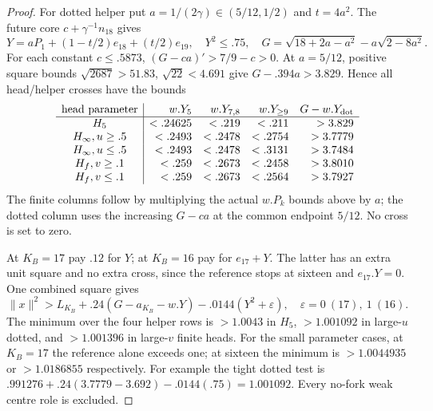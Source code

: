 \documentclass[11pt]{article}
\theoremstyle{definition}
\theoremstyle{remark}
\newcommand{\norm}[1]{\lVert #1\rVert}
\begin{document}
\begin{proof}
For dotted helper put $a=1/(2\gamma)\in(5/12,1/2)$ and
$t=4a^2$. The future core $c+\gamma^{-1}n_{18}$ gives
\[
 Y=aP_1+(1-t/2)e_{18}+(t/2)e_{19},\quad Y^2\le.75,
 \quad G=\sqrt{18+2a-a^2}-a\sqrt{2-8a^2}.
\]
For each constant $c\le.5873$, $(G-ca)'>7/9-c>0$.
At $a=5/12$, positive square bounds
$\sqrt{2687}>51.83$, $\sqrt{22}<4.691$ give
$G-.394a>3.829$. Hence all head/helper crosses have the bounds
\[
\begin{array}{c|rrrr}
\text{head parameter}&w.Y_5&w.Y_{7,8}&w.Y_{\ge9}&G-w.Y_{\rm dot}\\\hline
H_5&<.24625&<.219&<.211&>3.829\\
H_\infty, u\ge.5&<.2493&<.2478&<.2754&>3.7779\\
H_\infty, u\le.5&<.2493&<.2478&<.3131&>3.7484\\
H_f, v\ge.1&<.259&<.2673&<.2458&>3.8010\\
H_f, v\le.1&<.259&<.2673&<.2564&>3.7927
\end{array}
\]
The finite columns follow by multiplying the actual $w.P_k$
bounds above by $a$; the dotted column uses the increasing
$G-ca$ at the common endpoint $5/12$. No cross is set to zero.

At $K_B=17$ pay $.12$ for $Y$; at $K_B=16$ pay for
$e_{17}+Y$. The latter has an extra unit square and no extra
cross, since the reference stops at sixteen and $e_{17}.Y=0$.
One combined square gives
\begin{equation}\label{app:tail:eq:D20helperpay}
 \norm x^2>L_{K_B}+.24(G-a_{K_B}-w.Y)
                 -.0144(Y^2+\varepsilon),
 \quad\varepsilon=0\ (17),\ 1\ (16).
\end{equation}
The minimum over the four helper rows is $>1.0043$ in $H_5$,
$>1.001092$ in large-$u$ dotted, and $>1.001396$ in large-$v$
finite heads. For the small parameter cases, at $K_B=17$
the reference alone exceeds one; at sixteen the minimum is
$>1.0044935$ or $>1.0186855$ respectively. For example the
tight dotted test is
$.991276+.24(3.7779-3.692)-.0144(.75)=1.001092$.
Every no-fork weak centre role is excluded.


\end{proof}
\end{document}
